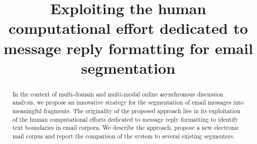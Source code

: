 \documentclass[11pt,a4paper]{article}
\title{Exploiting the human computational effort dedicated to message reply formatting for email segmentation}
\date{}
\begin{document}
\maketitle

\begin{abstract}
In the context of multi-domain and multi-modal online asynchronous discussion analysis, we propose an innovative strategy for the segmentation of email messages into meaningful fragments. The originality of the proposed approach lies in its exploitation of the human computational efforts dedicated to message reply formatting to identify text boundaries in email corpora. We describe the approach, propose a new electronic mail corpus and report the comparison of the system to several existing segmenters.
\end{abstract}
















\end{document}
